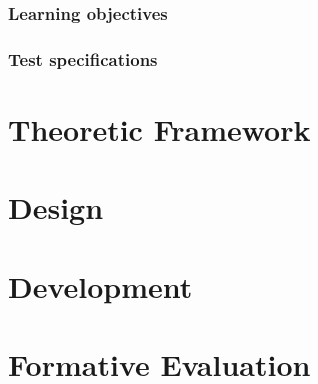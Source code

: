 \documentclass[11pt,twoside]{report} %
\begin{document}
\subsection{Learning objectives}

\subsection{Test specifications}


\chapter{Theoretic Framework}
\thispagestyle{fancy}


\chapter{Design}
\thispagestyle{fancy}


\chapter{Development}
\thispagestyle{fancy}


\chapter{Formative Evaluation}
\thispagestyle{fancy}



\end{document}
